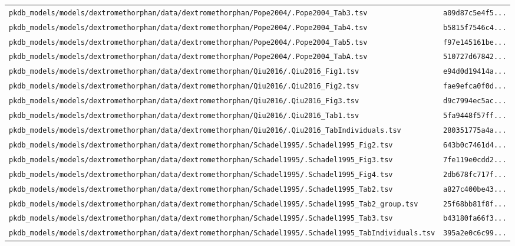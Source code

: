 \begin{longtable}{ll}
\texttt{pkdb\_models/models/dextromethorphan/data/dextromethorphan/Pope2004/.Pope2004\_Tab3.tsv} & \texttt{a09d87c5e4f5...} \\
\texttt{pkdb\_models/models/dextromethorphan/data/dextromethorphan/Pope2004/.Pope2004\_Tab4.tsv} & \texttt{b5815f7546c4...} \\
\texttt{pkdb\_models/models/dextromethorphan/data/dextromethorphan/Pope2004/.Pope2004\_Tab5.tsv} & \texttt{f97e145161be...} \\
\texttt{pkdb\_models/models/dextromethorphan/data/dextromethorphan/Pope2004/.Pope2004\_TabA.tsv} & \texttt{510727d67842...} \\
\texttt{pkdb\_models/models/dextromethorphan/data/dextromethorphan/Qiu2016/.Qiu2016\_Fig1.tsv} & \texttt{e94d0d19414a...} \\
\texttt{pkdb\_models/models/dextromethorphan/data/dextromethorphan/Qiu2016/.Qiu2016\_Fig2.tsv} & \texttt{fae9efca0f0d...} \\
\texttt{pkdb\_models/models/dextromethorphan/data/dextromethorphan/Qiu2016/.Qiu2016\_Fig3.tsv} & \texttt{d9c7994ec5ac...} \\
\texttt{pkdb\_models/models/dextromethorphan/data/dextromethorphan/Qiu2016/.Qiu2016\_Tab1.tsv} & \texttt{5fa9448f57ff...} \\
\texttt{pkdb\_models/models/dextromethorphan/data/dextromethorphan/Qiu2016/.Qiu2016\_TabIndividuals.tsv} & \texttt{280351775a4a...} \\
\texttt{pkdb\_models/models/dextromethorphan/data/dextromethorphan/Schadel1995/.Schadel1995\_Fig2.tsv} & \texttt{643b0c7461d4...} \\
\texttt{pkdb\_models/models/dextromethorphan/data/dextromethorphan/Schadel1995/.Schadel1995\_Fig3.tsv} & \texttt{7fe119e0cdd2...} \\
\texttt{pkdb\_models/models/dextromethorphan/data/dextromethorphan/Schadel1995/.Schadel1995\_Fig4.tsv} & \texttt{2db678fc717f...} \\
\texttt{pkdb\_models/models/dextromethorphan/data/dextromethorphan/Schadel1995/.Schadel1995\_Tab2.tsv} & \texttt{a827c400be43...} \\
\texttt{pkdb\_models/models/dextromethorphan/data/dextromethorphan/Schadel1995/.Schadel1995\_Tab2\_group.tsv} & \texttt{25f68bb81f8f...} \\
\texttt{pkdb\_models/models/dextromethorphan/data/dextromethorphan/Schadel1995/.Schadel1995\_Tab3.tsv} & \texttt{b43180fa66f3...} \\
\texttt{pkdb\_models/models/dextromethorphan/data/dextromethorphan/Schadel1995/.Schadel1995\_TabIndividuals.tsv} & \texttt{395a2e0c6c99...} \\

\end{longtable}
